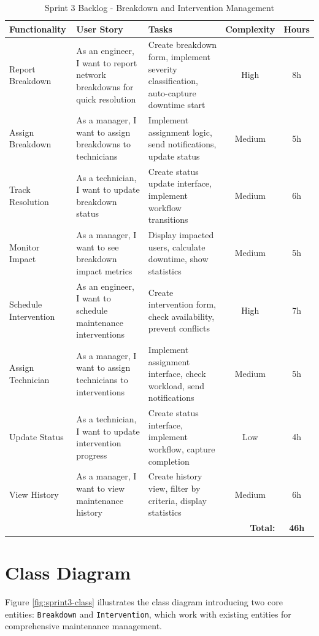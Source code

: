 \begin{table}[H]
\centering
\scriptsize
\caption{Sprint 3 Backlog - Breakdown and Intervention Management}
\label{tab:sprint3-backlog}
\begin{tabular}{|p{2.8cm}|p{4cm}|p{5cm}|c|c|}
\hline
\textbf{Functionality} & \textbf{User Story} & \textbf{Tasks} & \textbf{Complexity} & \textbf{Hours} \\
\hline
Report Breakdown & As an engineer, I want to report network breakdowns for quick resolution & Create breakdown form, implement severity classification, auto-capture downtime start & High & 8h \\
\hline
Assign Breakdown & As a manager, I want to assign breakdowns to technicians & Implement assignment logic, send notifications, update status & Medium & 5h \\
\hline
Track Resolution & As a technician, I want to update breakdown status & Create status update interface, implement workflow transitions & Medium & 6h \\
\hline
Monitor Impact & As a manager, I want to see breakdown impact metrics & Display impacted users, calculate downtime, show statistics & Medium & 5h \\
\hline
Schedule Intervention & As an engineer, I want to schedule maintenance interventions & Create intervention form, check availability, prevent conflicts & High & 7h \\
\hline
Assign Technician & As a manager, I want to assign technicians to interventions & Implement assignment interface, check workload, send notifications & Medium & 5h \\
\hline
Update Status & As a technician, I want to update intervention progress & Create status interface, implement workflow, capture completion & Low & 4h \\
\hline
View History & As a manager, I want to view maintenance history & Create history view, filter by criteria, display statistics & Medium & 6h \\
\hline
\multicolumn{4}{|r|}{\textbf{Total:}} & \textbf{46h} \\
\hline
\end{tabular}
\end{table}

\section{Class Diagram}

Figure \ref{fig:sprint3-class} illustrates the class diagram introducing two core entities: \texttt{Breakdown} and \texttt{Intervention}, which work with existing entities for comprehensive maintenance management.


